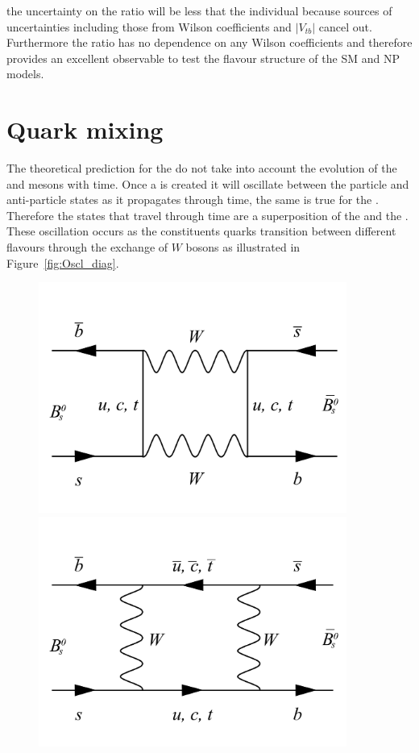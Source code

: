 {the uncertainty on the ratio will be less that the individual \BFs because sources of uncertainties including those from Wilson coefficients and $|V_{tb}|$ cancel out. Furthermore the ratio has no dependence on any Wilson coefficients and therefore provides an excellent observable to test the flavour structure of the SM and NP models.


\section{Quark mixing}
\label{sec:quarkmaixing}
The theoretical prediction for the \bmumu \BFs do not take into account the evolution of the \bsd and \barbsd mesons with time. Once a \bsd is created it will oscillate between the particle and anti-particle states as it propagates through time, the same is true for the \barbsd. Therefore the states that travel through time are a superposition of the \bsd and the \barbsd. These oscillation occurs as the constituents quarks transition between different flavours through the exchange of $W$ bosons as illustrated in Figure~\ref{fig:Oscl_diag}.
\begin{figure}[htbp]
    \centering
        \includegraphics[width=0.9\textwidth]{./Figs/Theory/Oscillation_1.pdf}
        \includegraphics[width=0.9\textwidth]{./Figs/Theory/Oscillation_2.pdf}

\end{figure}}
